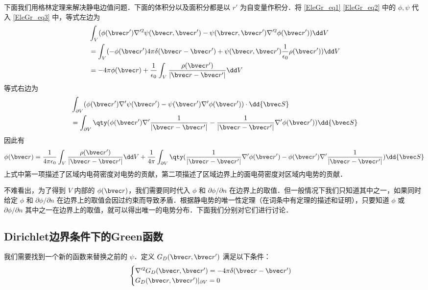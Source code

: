 下面我们用格林定理来解决静电边值问题．下面的体积分以及面积分都是以 $r'$ 为自变量作积分．将 \autoref{EleGr_eq1} \autoref{EleGr_eq2} 中的 $\phi,\psi$ 代入 \autoref{EleGr_eq3}  中，等式左边为
\begin{equation}
\begin{aligned}
&\int_V(\phi(\bvec r')\nabla'^2\psi(\bvec r,\bvec r')-\psi(\bvec r,\bvec r')\nabla'^2\phi(\bvec r'))\dd V
\\
&=\int_V(-\phi(\bvec r')4\pi \delta(\bvec r-\bvec r')+\psi(\bvec r,\bvec r')\frac{1}{\epsilon_0}\rho(\bvec r'))\dd V\\
&=-4\pi\phi(\bvec r)+\frac{1}{\epsilon_0}\int_V\frac{\rho(\bvec r')}{|\bvec r-\bvec r'|}\dd V
\end{aligned}
\end{equation}
等式右边为
\begin{equation}
\begin{aligned}
&\int_{\partial V}(\phi(\bvec r')\nabla'\psi(\bvec r')-\psi(\bvec r')\nabla'\phi(\bvec r'))\cdot \dd {\bvec S}\\
&=\int_{\partial V}\qty(\phi(\bvec r')\nabla'\frac{1}{|\bvec r-\bvec r'|}-\frac{1}{|\bvec r-\bvec r'|}\nabla'\phi(\bvec r'))\dd {\bvec S}
\end{aligned}
\end{equation}
因此有
\begin{equation}
\phi(\bvec r)=\frac{1}{4\pi\epsilon_0}\int_V\frac{\rho(\bvec r')}{|\bvec r-\bvec r'|}\dd V+\frac{1}{4\pi}\int_{\partial V}\qty(\frac{1}{|\bvec r-\bvec r'|}\nabla'\phi(\bvec r')-\phi(\bvec r')\nabla'\frac{1}{|\bvec r-\bvec r'|})\dd {\bvec S}
\end{equation}
上式中第一项描述了区域内电荷密度对电势的贡献，第二项描述了区域边界上的面电荷密度对区域内电势的贡献．

不难看出，为了得到 $V$ 内部的 $\phi(\bvec r)$，我们需要同时代入 $\phi$ 和 $\partial \phi/\partial n$ 在边界上的取值．但一般情况下我们只知道其中之一，如果同时给定 $\phi$ 和 $\partial \phi/\partial n$ 在边界上的取值会因过约束而导致矛盾．根据静电势的唯一性定理（在词条中有定理的描述和证明），只要知道 $\phi$ 或 $\partial \phi/\partial n$ 其中之一在边界上的取值，就可以得出唯一的电势分布．下面我们分别对它们进行讨论．

\subsection{Dirichlet边界条件下的Green函数}

我们需要找到一个新的函数来替换之前的 $\psi$．定义 $G_D(\bvec r,\bvec r')$ 满足以下条件：
\begin{equation}
\begin{cases}
\nabla'^2G_D(\bvec r,\bvec r')=-4\pi\delta(\bvec r-\bvec r')\\
G_D(\bvec r,\bvec r')|_{\partial V}=0
\end{cases}
\end{equation}

